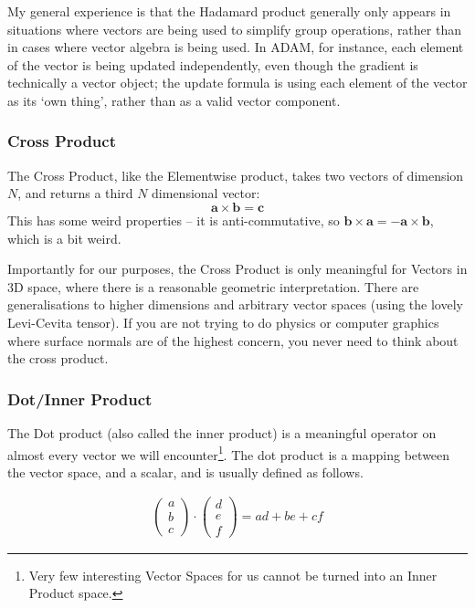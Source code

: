 \documentclass[a4paper,openany,11pt]{book}
\renewcommand\vec[1]{\boldsymbol{\mathbf{#1}}}
\begin{document}
					My general experience is that the Hadamard product generally only appears in situations where vectors are being used to simplify group operations, rather than in cases where vector algebra is being used. In ADAM, for instance, each element of the vector is being updated independently, even though the gradient is technically a vector object; the update formula is using each element of the vector as its `own thing', rather than as a valid vector component. 				
					
				\subsubsection{Cross Product}
					
					The Cross Product, like the Elementwise product, takes two vectors of dimension $N$, and returns a third $N$ dimensional vector:
					$$\vec{a} \times \vec{b} = \vec{c} $$
					This has some weird properties -- it is anti-commutative, so $\vec{b} \times \vec{a} = - \vec{a} \times \vec{b}$, which is a bit weird. 

					Importantly for our purposes, the Cross Product is only meaningful for Vectors in 3D space, where there is a reasonable geometric interpretation. There are generalisations to higher dimensions and arbitrary vector spaces (using the lovely {Levi-Cevita tensor}). If you are not trying to do physics or computer graphics where surface normals are of the highest concern, you never need to think about the cross product.

				\subsubsection{Dot/Inner Product}

					The Dot product (also called the inner product) is a meaningful operator on almost every vector we will encounter\footnote{Very few interesting Vector Spaces for us cannot be turned into an Inner Product space.}. The dot product is a mapping between the vector space, and a scalar, and is usually defined as follows.

					\begin{align}
						\begin{pmatrix}
							a \\ b \\ c
						\end{pmatrix} \cdot \begin{pmatrix}
							d \\ e \\ f
						\end{pmatrix} = ad + be + cf
					\end{align}
\end{document}

